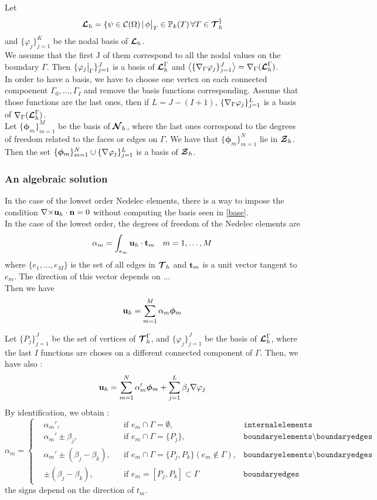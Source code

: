 Let \[ {\bm{\mathcal{L}}}_h=\{\psi\in\mathcal{C}(\Omega) \,|\,
\phi{\big\rvert_{T}}\in{\mathbb{P}}_k(T)\,\forall T\in{\bm{\mathcal{T}}}_h^\} \]
and $\{\varphi_j\}_{j=1}^K$ be the nodal basis of ${\bm{\mathcal{L}}}_h$.\\
We assume that the first J of them correspond to all the nodal values on the
boundary $\Gamma$. Then $\{\varphi_j{\big\rvert_{\Gamma}}\}_{j=1}^J$ is a
basis of ${\bm{\mathcal{L}}}_h^\Gamma$ and
$\left\langle\{{\nabla}_\Gamma\varphi_j\}_{j=1}^J\right\rangle={\nabla}_\Gamma({\bm{\mathcal{L}}}_h^\Gamma)$.\\
In order to have a basis, we have to choose one vertex on each connected
compoenent $\Gamma_0,\dots,\Gamma_I$ and remove the basis functions
corresponding. Assume that those functions are the last ones, then if
$L=J-(I+1)$, $\{{\nabla}_\Gamma\varphi_j\}_{j=1}^L$ is a basis of
${\nabla}_\Gamma({\bm{\mathcal{L}}}_h^\Gamma)$.\\
Let $\{\bm{\phi}_m\}_{m=1}^M$ be the basis of ${\bm{\mathcal{N}}}_h$, where the last ones
correspond to the degrees of freedom related to the faces or edges on
$\Gamma$. We have that $\{\bm{\phi}_m\}_{m=1}^N$ lie in ${\bm{\mathcal{Z}}}_h$.\\

Then the set $\{\bm{\phi}_m\}_{m=1}^N\cup  \{{\nabla}\varphi_j\}_{j=1}^L$
is a basis of ${\bm{\mathcal{Z}}}_h$.

\subsubsection{An algebraic solution}
In the case of the lowest order Nedelec elements, there is a way to impose the
condition ${\nabla\times}{\mathbf{u}}_h\cdot{\mathbf{n}}=0$ without computing the basis seen in
  \ref{base}.\\
In the case of the lowest order, the degrees of freedom of the Nedelec elements
are \[\alpha_m=\int_{e_m} {\mathbf{u}}_h\cdot{\mathbf{t}}_m \quad m=1,\dots,M\] where $\{e_1,\dots,e_M\}$ is the set
of all edges in ${\bm{\mathcal{T}}}_h$ and ${\mathbf{t}}_m$ is a unit vector tangent to $e_m$. The
direction of this vector depends on ...\\
Then we have \[{\mathbf{u}}_h = \sum_{m=1}^M \alpha_m\bm{\phi}_m\]

Let $\{P_j\}_{j=1}^J$ be the set of vertices of ${\bm{\mathcal{T}}}_h^\Gamma$, and
$\{\varphi_j\}_{j=1}^J$ be the basis of ${\bm{\mathcal{L}}}_h^\Gamma$, where the last $I$
functions are choses on a different connected component of $\Gamma$. Then, we have also :
\[ {\mathbf{u}}_h = \sum_{m=1}^N \alpha_m'\bm{\phi}_m + \sum_{j=1}^L
\beta_j{\nabla}\varphi_j \]
By identification, we obtain :
\[
\alpha_m=\left\{\begin{aligned}
&\alpha_m', &&\mbox{if } e_m\cap\Gamma = \emptyset, &\texttt{internalelements}\\
&\alpha_m'\pm \beta_j, &&\mbox{if } e_m\cap\Gamma = \{P_j\},& \texttt{boundaryelements}\setminus\texttt{boundaryedges}\\
&\alpha_m'\pm (\beta_j-\beta_k), &&\mbox{if } e_m\cap\Gamma = \{P_j,P_k\}
(e_m\notin\Gamma),& \texttt{boundaryelements}\setminus\texttt{boundaryedges}\\
&\pm (\beta_j-\beta_k), &&\mbox{if } e_m=[P_j,P_k]\subset\Gamma & \texttt{boundaryedges}
\end{aligned}\right.
\]
the signs depend on the direction of $t_m$.\\

